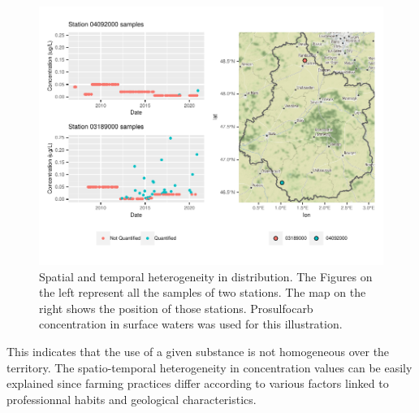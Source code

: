 \begin{figure}[htbp]
    \centering
    \includegraphics{figs/Chap3/Het_resC.pdf}
    \caption{Spatial and temporal heterogeneity in distribution. The Figures on the left represent all the samples of two stations. The map on the right shows the position of those stations. Prosulfocarb concentration in surface waters was used for this illustration.}
    \label{fig:het_spa_ex}
\end{figure}

This indicates that the use of a given substance is not homogeneous over the territory. The spatio-temporal heterogeneity in concentration values can be easily explained since farming practices differ according to various factors linked to professionnal habits and geological characteristics. 





